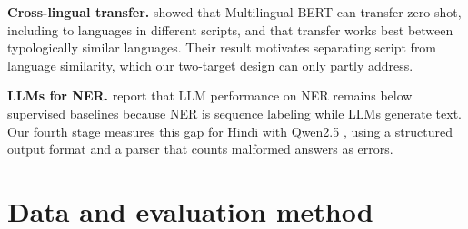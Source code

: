 \documentclass[10pt,twoside,a4paper]{article}
\begin{document}
\textbf{Cross-lingual transfer.} \citet{pires2019} showed that Multilingual BERT can transfer zero-shot, including to languages in different scripts, and that transfer works best between typologically similar languages. Their result motivates separating script from language similarity, which our two-target design can only partly address.

\textbf{LLMs for NER.} \citet{wang2023} report that LLM performance on NER remains below supervised baselines because NER is sequence labeling while LLMs generate text. Our fourth stage measures this gap for Hindi with Qwen2.5 \citep{qwen2024}, using a structured output format and a parser that counts malformed answers as errors.

\section{Data and evaluation method}\label{sec:2}
\end{document}
